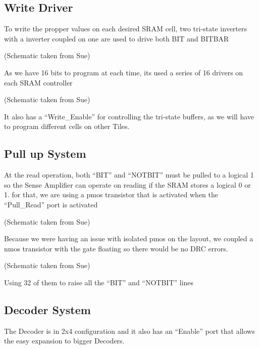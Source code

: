 \documentclass[letterpaper,10pt,english]{sphinxmanual}
\begin{document}
\subsection{Write Driver}
\label{writedrive:write-driver}\label{writedrive::doc}
To write the propper values on each desired SRAM cell, two tri-state inverters with a inverter coupled on one are used to drive both BIT and BITBAR

\noindent{}

(Schematic taken from Sue)

As we have 16 bits to program at each time, its used a series of 16 drivers on each SRAM controller

\noindent{}

(Schematic taken from Sue)

It also has a ``Write\_Enable'' for controlling the tri-state buffers, as we will have to program different cells on other Tiles.


\subsection{Pull up System}
\label{pullupbit::doc}\label{pullupbit:pull-up-system}
At the read operation, both ``BIT'' and ``NOTBIT'' must be pulled to a logical 1 so the Sense Amplifier can operate on reading if the SRAM stores a logical 0 or 1. for that, we are using a pmos transistor that is activated when the ``Pull\_Read'' port is activated

\noindent{}

(Schematic taken from Sue)

Because we were having an issue with isolated pmos on the layout, we coupled a nmos transistor with the gate floating so there would be no DRC errors.

\noindent{}

(Schematic taken from Sue)

Using 32 of them to raise all the ``BIT'' and ``NOTBIT'' lines


\subsection{Decoder System}
\label{decodersystem:decoder-system}\label{decodersystem::doc}
The Decoder is in 2x4 configuration and it also has an ``Enable'' port that allows the easy expansion to bigger Decoders.
\end{document}
